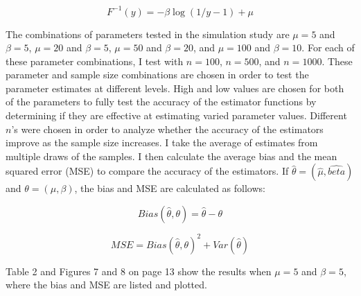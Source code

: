 \documentclass{svproc}
\begin{document}
\begin{equation}
F^{-1}(y) = - \beta \log(1/y-1) + \mu
\label{5.01}
\end{equation}

\bigskip

The combinations of parameters tested in the simulation study are $\mu=5$ and $\beta=5$, $\mu=20$ and $\beta=5$, $\mu=50$ and $\beta=20$, and $\mu=100$ and $\beta=10$. For each of these parameter combinations, I test with $n=100$, $n=500$, and $n=1000$. These parameter and sample size combinations are chosen in order to test the parameter estimates at different levels. High and low values are chosen for both of the parameters to fully test the accuracy of the estimator functions by determining if they are effective at estimating varied parameter values. Different $n$'s were chosen in order to analyze whether the accuracy of the estimators improve as the sample size increases. I take the average of estimates from multiple draws of the samples. I then calculate the average bias and the mean squared error (MSE) to compare the accuracy of the estimators. If $\hat{\theta} = (\hat{\mu}, \hat{beta})$ and $\theta = (\mu,\beta)$, the bias and MSE are calculated as follows:

\begin{equation}
Bias(\hat{\theta},\theta) = \hat{\theta} - \theta
\label{5.1}
\end{equation}

\begin{equation}
MSE = Bias(\hat{\theta},\theta)^2 + Var(\hat{\theta})
\label{5.2}
\end{equation}

\bigskip

Table 2 and Figures 7 and 8 on page 13 show the results when $\mu=5$ and $\beta=5$, where the bias and MSE are listed and plotted.
\end{document}
